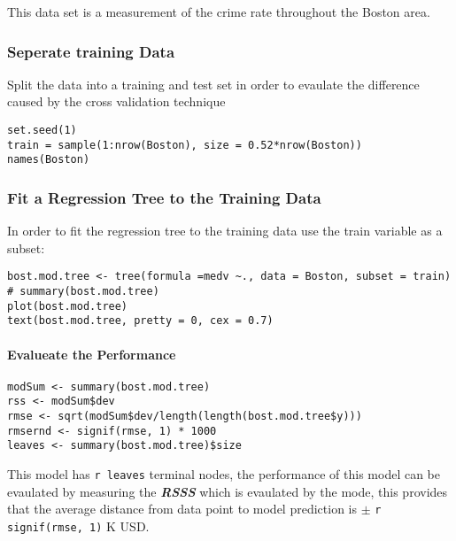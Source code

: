 \documentclass[
]{article}
\newcommand{\passthrough}[1]{#1}
\begin{document}
This data set is a measurement of the crime rate throughout the Boston
area.

\hypertarget{seperate-training-data}{%
\subsubsection{Seperate training Data}\label{seperate-training-data}}

Split the data into a training and test set in order to evaulate the
difference caused by the cross validation technique

\begin{lstlisting}
set.seed(1)
train = sample(1:nrow(Boston), size = 0.52*nrow(Boston))
names(Boston)
\end{lstlisting}

\hypertarget{fit-a-regression-tree-to-the-training-data}{%
\subsubsection{Fit a Regression Tree to the Training
Data}\label{fit-a-regression-tree-to-the-training-data}}

In order to fit the regression tree to the training data use the train
variable as a subset:

\begin{lstlisting}
bost.mod.tree <- tree(formula =medv ~., data = Boston, subset = train)
# summary(bost.mod.tree)
plot(bost.mod.tree)
text(bost.mod.tree, pretty = 0, cex = 0.7)

\end{lstlisting}

\hypertarget{evalueate-the-performance}{%
\paragraph{Evalueate the Performance}\label{evalueate-the-performance}}

\begin{lstlisting}
modSum <- summary(bost.mod.tree)
rss <- modSum$dev
rmse <- sqrt(modSum$dev/length(length(bost.mod.tree$y)))
rmsernd <- signif(rmse, 1) * 1000
leaves <- summary(bost.mod.tree)$size
\end{lstlisting}

This model has \passthrough{\lstinline!r leaves!} terminal nodes, the
performance of this model can be evaulated by measuring the
\textbf{\emph{RSSS}} which is evaulated by the mode, this provides that
the average distance from data point to model prediction is \(\pm\)
\passthrough{\lstinline!r signif(rmse, 1)!} K USD.
\end{document}
